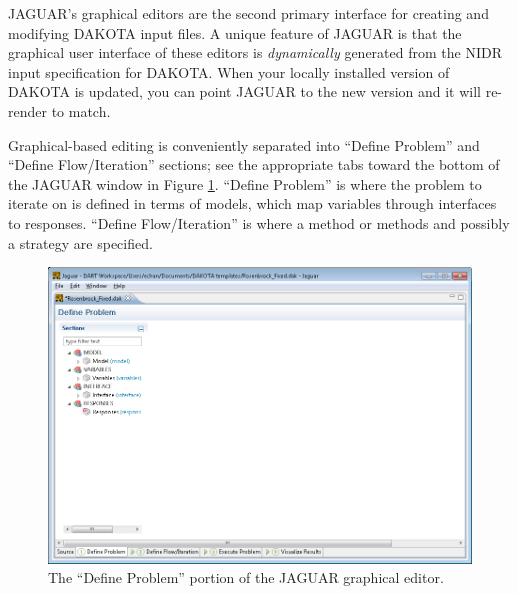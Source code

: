 JAGUAR's graphical editors are the second primary interface for
creating and modifying DAKOTA input files.  A unique feature of JAGUAR
is that the graphical user interface of these editors is {\em
dynamically} generated from the NIDR input specification for DAKOTA.
When your locally installed version of DAKOTA is updated, you can
point JAGUAR to the new version and it will re-render to match.

Graphical-based editing is conveniently separated into ``Define
Problem'' and ``Define Flow/Iteration'' sections; see the appropriate
tabs toward the bottom of the JAGUAR window in Figure
\ref{fig:input:jag_graphical1}.  ``Define Problem'' is where the
problem to iterate on is defined in terms of models, which map
variables through interfaces to responses.  ``Define Flow/Iteration''
is where a method or methods and possibly a strategy are specified.
\begin{figure}
  \centering
  \includegraphics[scale=0.4]{images/2_1jag_graphical1}
  \caption{The ``Define Problem'' portion of the JAGUAR graphical
    editor.}
  \label{fig:input:jag_graphical1}
\end{figure}

